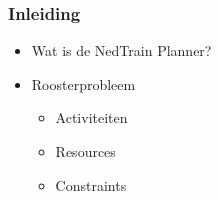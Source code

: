 \begin{frame}\frametitle{Inleiding}
\begin{itemize}
    \item Wat is de NedTrain Planner?
    \item Roosterprobleem
    \begin{itemize}
        \item Activiteiten
        \item Resources
        \item Constraints
    \end{itemize}
\end{itemize}
\end{frame}
